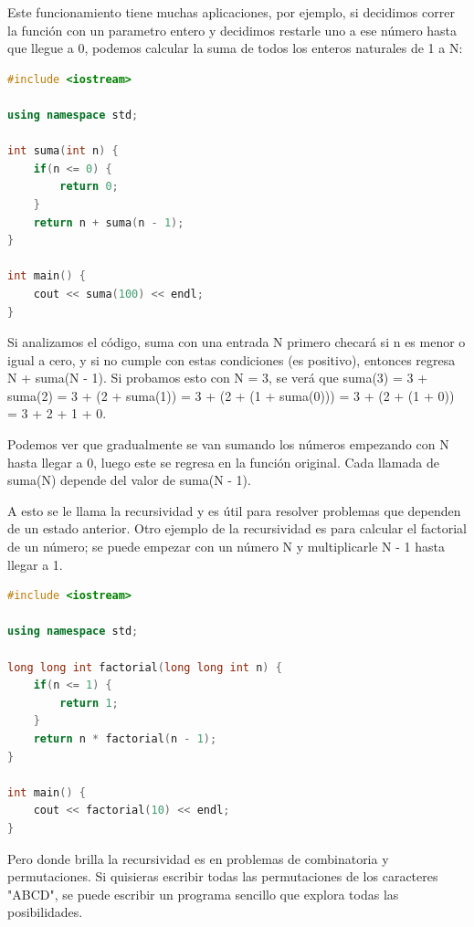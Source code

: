 \documentclass{article}
\begin{document}
Este funcionamiento tiene muchas aplicaciones, por ejemplo, si decidimos correr la función con un parametro entero y decidimos restarle uno a ese número hasta que llegue a 0, podemos calcular la suma de todos los enteros naturales de 1 a N:

\begin{lstlisting}[language=C++, caption=Suma de enteros]
#include <iostream>

using namespace std;

int suma(int n) {
    if(n <= 0) {
        return 0;
    }
    return n + suma(n - 1);
}

int main() {
    cout << suma(100) << endl;
}
\end{lstlisting}

Si analizamos el código, suma con una entrada N primero checará si n es menor o igual a cero, y si no cumple con estas condiciones (es positivo), entonces regresa N + suma(N - 1). Si probamos esto con N = 3, se verá que suma(3) = 3 + suma(2) = 3 + (2 + suma(1)) = 3 + (2 + (1 + suma(0))) = 3 + (2 + (1 + 0)) = 3 + 2 + 1 + 0.

Podemos ver que gradualmente se van sumando los números empezando con N hasta llegar a 0, luego este se regresa en la función original. Cada llamada de suma(N) depende del valor de suma(N - 1).

A esto se le llama la recursividad y es útil para resolver problemas que dependen de un estado anterior. Otro ejemplo de la recursividad es para calcular el factorial de un número; se puede empezar con un número N y multiplicarle N - 1 hasta llegar a 1.

\begin{lstlisting}[language=C++, caption=Factorial recursivo]
#include <iostream>

using namespace std;

long long int factorial(long long int n) {
    if(n <= 1) {
        return 1;
    }
    return n * factorial(n - 1);
}

int main() {
    cout << factorial(10) << endl;
}
\end{lstlisting}

Pero donde brilla la recursividad es en problemas de combinatoria y permutaciones. Si quisieras escribir todas las permutaciones de los caracteres "ABCD", se puede escribir un programa sencillo que explora todas las posibilidades.
\end{document}
